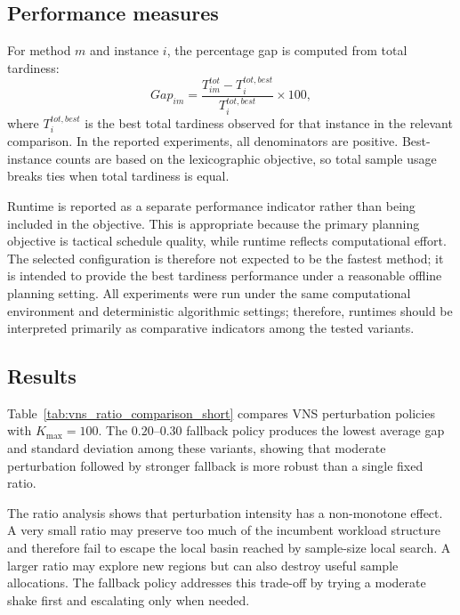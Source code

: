 \documentclass[11pt]{article}
\begin{document}
\subsection{Performance measures}
\label{subsec:metrics}

For method \(m\) and instance \(i\), the percentage gap is computed from total tardiness:
\[
Gap_{im}=
\frac{T^{tot}_{im}-T^{tot,best}_{i}}
{T^{tot,best}_{i}}\times 100,
\]
where \(T^{tot,best}_{i}\) is the best total tardiness observed for that instance in the relevant comparison. In the reported experiments, all denominators are positive. Best-instance counts are based on the lexicographic objective, so total sample usage breaks ties when total tardiness is equal.

Runtime is reported as a separate performance indicator rather than being included in the objective. This is appropriate because the primary planning objective is tactical schedule quality, while runtime reflects computational effort. The selected configuration is therefore not expected to be the fastest method; it is intended to provide the best tardiness performance under a reasonable offline planning setting. All experiments were run under the same computational environment and deterministic algorithmic settings; therefore, runtimes should be interpreted primarily as comparative indicators among the tested variants.

\subsection{Results}
\label{subsec:results}

Table~\ref{tab:vns_ratio_comparison_short} compares VNS perturbation policies with \(K_{\max}=100\). The \(0.20\)--\(0.30\) fallback policy produces the lowest average gap and standard deviation among these variants, showing that moderate perturbation followed by stronger fallback is more robust than a single fixed ratio.

The ratio analysis shows that perturbation intensity has a non-monotone effect. A very small ratio may preserve too much of the incumbent workload structure and therefore fail to escape the local basin reached by sample-size local search. A larger ratio may explore new regions but can also destroy useful sample allocations. The fallback policy addresses this trade-off by trying a moderate shake first and escalating only when needed.
\end{document}
